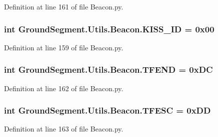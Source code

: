 Definition at line 161 of file Beacon.\+py.

\hypertarget{namespace_ground_segment_1_1_utils_1_1_beacon_a5bbb6ca31f495f6a4753e7ce77a3a37c}{}
\subsubsection[{K\+I\+S\+S\+\_\+\+I\+D}]{\setlength{\rightskip}{0pt plus 5cm}int Ground\+Segment.\+Utils.\+Beacon.\+K\+I\+S\+S\+\_\+\+I\+D = 0x00}\label{namespace_ground_segment_1_1_utils_1_1_beacon_a5bbb6ca31f495f6a4753e7ce77a3a37c}


Definition at line 159 of file Beacon.\+py.

\hypertarget{namespace_ground_segment_1_1_utils_1_1_beacon_a6ee81cd27f11b67a60f393db79b346e1}{}
\subsubsection[{T\+F\+E\+N\+D}]{\setlength{\rightskip}{0pt plus 5cm}int Ground\+Segment.\+Utils.\+Beacon.\+T\+F\+E\+N\+D = 0x\+D\+C}\label{namespace_ground_segment_1_1_utils_1_1_beacon_a6ee81cd27f11b67a60f393db79b346e1}


Definition at line 162 of file Beacon.\+py.

\hypertarget{namespace_ground_segment_1_1_utils_1_1_beacon_a43e72faab7c53cb2b7af733f184637fd}{}
\subsubsection[{T\+F\+E\+S\+C}]{\setlength{\rightskip}{0pt plus 5cm}int Ground\+Segment.\+Utils.\+Beacon.\+T\+F\+E\+S\+C = 0x\+D\+D}\label{namespace_ground_segment_1_1_utils_1_1_beacon_a43e72faab7c53cb2b7af733f184637fd}


Definition at line 163 of file Beacon.\+py.

